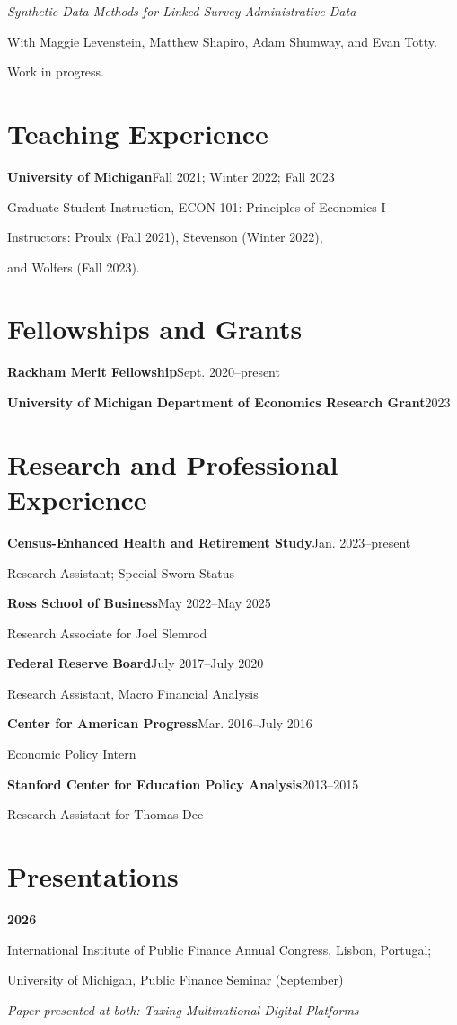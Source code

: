 \documentclass[11pt,letterpaper]{article}
\newcommand{\entry}[2]{\textbf{#1}\hfill #2\par}
\newcommand{\gap}{\vspace{6pt}}
\begin{document}
\textit{Synthetic Data Methods for Linked Survey-Administrative Data}\par
With Maggie Levenstein, Matthew Shapiro, Adam Shumway, and Evan Totty.\par
Work in progress.

\section{Teaching Experience}
\entry{University of Michigan}{Fall 2021; Winter 2022; Fall 2023}
Graduate Student Instruction, ECON 101: Principles of Economics I\par
Instructors: Proulx (Fall 2021), Stevenson (Winter 2022),\par
and Wolfers (Fall 2023).

\section{Fellowships and Grants}
\entry{Rackham Merit Fellowship}{Sept. 2020--present}
\gap
\entry{University of Michigan Department of Economics Research Grant}{2023}

\newpage
\section{Research and Professional Experience}
\entry{Census-Enhanced Health and Retirement Study}{Jan. 2023--present}
Research Assistant; Special Sworn Status
\gap

\entry{Ross School of Business}{May 2022--May 2025}
Research Associate for Joel Slemrod
\gap

\entry{Federal Reserve Board}{July 2017--July 2020}
Research Assistant, Macro Financial Analysis
\gap

\entry{Center for American Progress}{Mar. 2016--July 2016}
Economic Policy Intern
\gap

\entry{Stanford Center for Education Policy Analysis}{2013--2015}
Research Assistant for Thomas Dee

\section{Presentations}
\textbf{2026}\par
International Institute of Public Finance Annual Congress, Lisbon, Portugal;\par
University of Michigan, Public Finance Seminar (September)\par
\textit{Paper presented at both: Taxing Multinational Digital Platforms}
\gap
\end{document}
